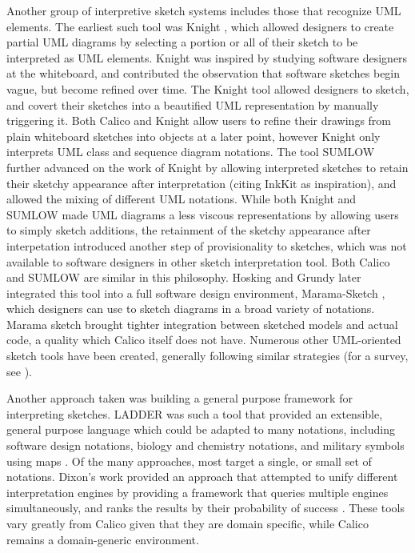 Another group of interpretive sketch systems includes those that recognize UML elements. The earliest such tool was Knight \citep{damm2000tool}, which allowed  designers to create partial UML diagrams by selecting a portion or all of their sketch to be interpreted as UML elements. Knight was inspired by studying software designers at the whiteboard, and contributed the observation that software sketches begin vague, but become refined over time. The Knight tool allowed designers to sketch, and covert their sketches into a beautified UML representation by manually triggering it. Both Calico and Knight allow users to refine their drawings from plain whiteboard sketches into objects at a later point, however Knight only interprets UML class and sequence diagram notations. The tool SUMLOW \citep{chen2008sumlow} further advanced on the work of Knight by allowing interpreted sketches to retain their sketchy appearance after interpretation (citing InkKit as inspiration), and allowed the mixing of different UML notations. While both Knight and SUMLOW made UML diagrams a less viscous representations by allowing users to simply sketch additions, the retainment of the sketchy appearance after interpetation introduced another step of provisionality to sketches, which was not available to software designers in other sketch interpretation tool. Both Calico and SUMLOW are similar in this philosophy. Hosking and Grundy later integrated this tool into a full software design environment, Marama-Sketch \citep{Grundy}, which designers can use to sketch diagrams in a broad variety of notations. Marama sketch brought tighter integration between sketched models and actual code, a quality which Calico itself does not have. Numerous other UML-oriented sketch tools have been created, generally following similar strategies (for a survey, see \citep{Johnson}). 

Another approach taken was building a general purpose framework for interpreting sketches. LADDER was such a tool that provided an extensible, general purpose language which could be adapted to many notations, including software design notations, biology and chemistry notations, and military symbols using maps \cite{hammond2006ladder}. Of the many approaches, most target a single, or small set of notations. Dixon's work provided an approach that attempted to unify different interpretation engines by providing a framework that queries multiple engines simultaneously, and ranks the results by their probability of success \cite{dixon2008whiteboards}. These tools vary greatly from Calico given that they are domain specific, while Calico remains a domain-generic environment.

